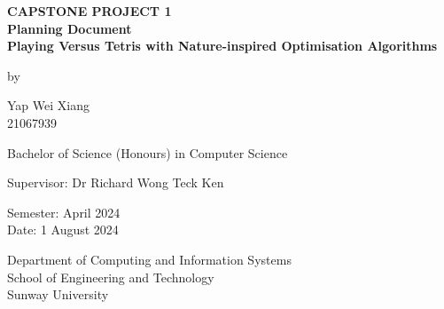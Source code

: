 \documentclass[a4paper, 12pt]{extreport}
\begin{document}
	\begin{titlepage}
		
		\centering
		
		\vspace{.5cm}
		
		\begin{center}
			\textbf{\large CAPSTONE PROJECT 1} \\
			\textbf{\large Planning Document} \\
			\vspace{1cm}
			\textbf{\large Playing Versus Tetris with Nature-inspired Optimisation Algorithms}
			
			\vspace{1cm}
			
			by
			
			\vspace{1cm}
			
			\large Yap Wei Xiang \\
			21067939
			
			\vspace{1cm}
			
			Bachelor of Science (Honours) in Computer Science
			
			\vspace{1cm}
			
			\large Supervisor: Dr Richard Wong Teck Ken
			
			\vspace{1cm}
			
			\normalsize Semester: April 2024 \\
			Date: 1 August 2024
			
			\vfill
			
			Department of Computing and Information Systems\\
			School of Engineering and Technology\\
			Sunway University
		\end{center}
		
	\end{titlepage}
	
\end{document}
